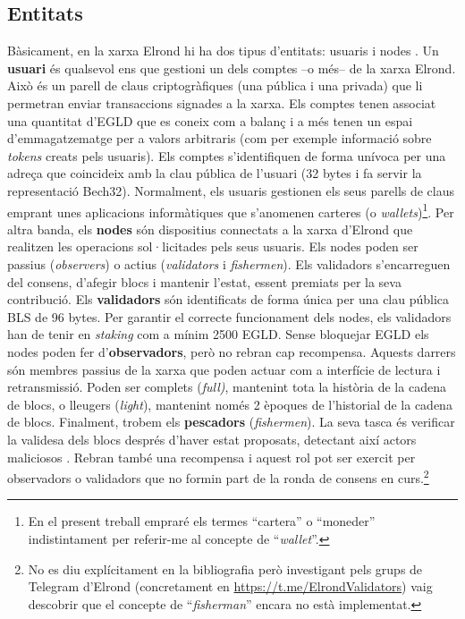 \documentclass[11pt,a4paper]{article}
\begin{document}
\subsection{Entitats}
\label{sub:entitat}
Bàsicament, en la xarxa Elrond hi ha dos tipus d'entitats: usuaris i nodes \cite{elrond2022}. Un \textbf{usuari} és qualsevol ens que gestioni un dels comptes –o més– de la xarxa Elrond. Això és un parell de claus criptogràfiques (una pública i una privada) que li permetran enviar transaccions signades a la xarxa. Els comptes tenen associat una quantitat d'EGLD que es coneix com a balanç i a més tenen un espai d'emmagatzematge per a valors arbitraris (com per exemple informació sobre \textit{tokens} creats pels usuaris). Els comptes s'identifiquen de forma unívoca per una adreça que coincideix amb la clau pública de l'usuari (32 bytes i fa servir la representació Bech32). Normalment, els usuaris gestionen els seus parells de claus emprant unes aplicacions informàtiques que s'anomenen carteres (o \textit{wallets})\footnote{En el present treball empraré els termes ``cartera'' o ``moneder'' indistintament per referir-me al concepte de ``\textit{wallet}''.}. Per altra banda, els \textbf{nodes} són dispositius connectats a la xarxa d'Elrond que realitzen les operacions sol·licitades pels seus usuaris. Els nodes poden ser passius (\textit{observers}) o actius (\textit{validators} i \textit{fishermen}). Els validadors s'encarreguen del consens, d'afegir blocs i mantenir l'estat, essent premiats per la seva contribució. Els \textbf{validadors} són identificats de forma única per una clau pública BLS de 96 bytes. Per garantir el correcte funcionament dels nodes, els validadors han de tenir en \textit{staking} com a mínim 2500 EGLD. Sense bloquejar EGLD els nodes poden fer d'\textbf{observadors}, però no rebran cap recompensa. Aquests darrers són membres passius de la xarxa que poden actuar com a interfície de lectura i retransmissió. Poden ser complets (\textit{full)}, mantenint tota la història de la cadena de blocs, o lleugers (\textit{light}), mantenint només 2 èpoques de l'historial de la cadena de blocs. Finalment, trobem els \textbf{pescadors} (\textit{fishermen}). La seva tasca és verificar la validesa dels blocs després d'haver estat proposats, detectant així actors maliciosos \cite{elrond2022-2}. Rebran també una recompensa i aquest rol pot ser exercit per observadors o validadors que no formin part de la ronda de consens en curs.\footnote{No es diu explícitament en la bibliografia però investigant pels grups de Telegram d'Elrond (concretament en \url{https://t.me/ElrondValidators}) vaig descobrir que el concepte de ``\textit{fisherman}'' encara no està implementat.}
\end{document}
